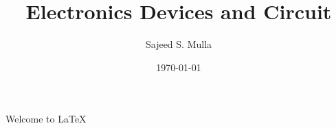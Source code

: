 \documentclass[12pt,a4paper]{report}
\title{Electronics Devices and Circuit}
\author{Sajeed S. Mulla}
\date{\today}
\begin{document}
\maketitle
Welcome to \LaTeX
\end{document}
